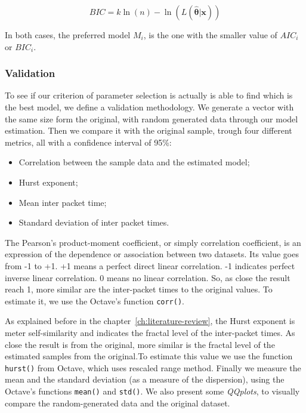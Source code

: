 \begin{equation}
BIC = k\ln(n) - \ln(L(\boldsymbol{\hat{\theta}}|\boldsymbol{x}))
\end{equation}

In both cases, the preferred model $M_i$, is the one with the smaller value of $AIC_i$ or $BIC_i$.




\subsubsection{Validation}

To see if our criterion of parameter selection is actually is able to find which is the best model, we define a validation methodology. 
We generate a vector with the same size form the original, with random generated data through our model estimation. Then we compare it with the original sample, trough four different metrics, all with a confidence interval of 95\%:

\begin{itemize}
\item Correlation between the sample data and the estimated model;
\item Hurst exponent;
\item Mean inter packet time;
\item Standard deviation of inter packet times.
\end{itemize}

The Pearson's product-moment coefficient, or simply correlation coefficient,  is an expression of the dependence or association between two datasets. Its value goes from -1 to +1. +1 means a perfect direct linear correlation. -1 indicates perfect inverse linear correlation. 0 means no linear correlation. So, as close the result reach 1, more similar are the inter-packet times to the original values. To estimate it, we use the Octave's function \texttt{corr()}.

As explained before in the chapter~\ref{ch:literature-review}, the Hurst exponent is meter self-similarity and indicates the fractal level of the inter-packet times. As close the result is from the original, more similar is the fractal level of the estimated samples from the original.To estimate this value we use the function \texttt{hurst()} from Octave, which uses rescaled range method.
Finally we measure the mean and the standard deviation (as a measure of the dispersion), using the Octave's functions \texttt{mean()} and \texttt{std()}. We also present some \textit{QQplots}, to visually compare the random-generated data and the original dataset. 

